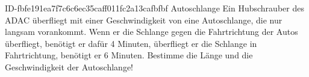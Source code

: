 \begin{exercise}
      {ID-fbfe191ea7f7c6c6ec35caff011fc2a13cafbfbf}
      {Autoschlange}
  \ifproblem\problem
    Ein Hubschrauber des ADAC überfliegt mit einer Geschwindigkeit von 
    eine Autoschlange, die nur langsam vorankommt. Wenn er die Schlange gegen die
    Fahrtrichtung der Autos überfliegt, benötigt er dafür 4 Minuten, überfliegt er
    die Schlange in Fahrtrichtung, benötigt er 6 Minuten. Bestimme die Länge und
    die Geschwindigkeit der Autoschlange!
  \fi
\end{exercise}

